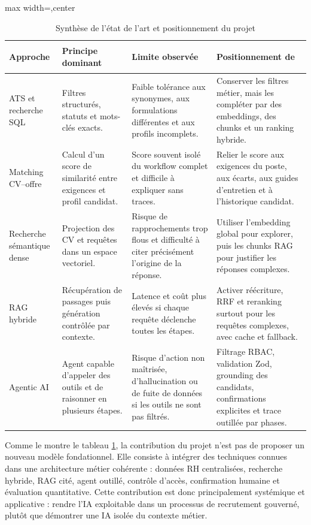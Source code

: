 \begin{table}[H]
  \centering
  \scriptsize
  \caption{\label{tab:state-of-art-positioning}Synthèse de l'état de l'art et positionnement du projet}
  \begin{adjustbox}{max width=\linewidth,center}
  \begin{tabularx}{\textwidth}{>{\bfseries\raggedright\arraybackslash}p{2.8cm}>{\raggedright\arraybackslash}X>{\raggedright\arraybackslash}X>{\raggedright\arraybackslash}X}
    \toprule
    Approche & Principe dominant & Limite observée & Positionnement de \projectname{} \\
    \midrule
    ATS et recherche SQL & Filtres structurés, statuts et mots-clés exacts. & Faible tolérance aux synonymes, aux formulations différentes et aux profils incomplets. & Conserver les filtres métier, mais les compléter par des embeddings, des chunks et un ranking hybride. \\
    Matching CV--offre & Calcul d'un score de similarité entre exigences et profil candidat. & Score souvent isolé du workflow complet et difficile à expliquer sans traces. & Relier le score aux exigences du poste, aux écarts, aux guides d'entretien et à l'historique candidat. \\
    Recherche sémantique dense & Projection des CV et requêtes dans un espace vectoriel. & Risque de rapprochements trop flous et difficulté à citer précisément l'origine de la réponse. & Utiliser l'embedding global pour explorer, puis les chunks RAG pour justifier les réponses complexes. \\
    RAG hybride & Récupération de passages puis génération contrôlée par contexte. & Latence et coût plus élevés si chaque requête déclenche toutes les étapes. & Activer réécriture, RRF et reranking surtout pour les requêtes complexes, avec cache et fallback. \\
    Agentic AI & Agent capable d'appeler des outils et de raisonner en plusieurs étapes. & Risque d'action non maîtrisée, d'hallucination ou de fuite de données si les outils ne sont pas filtrés. & Filtrage RBAC, validation Zod, grounding des candidats, confirmations explicites et trace outillée par phases. \\
    \bottomrule
  \end{tabularx}
  \end{adjustbox}
\end{table}

Comme le montre le tableau \ref{tab:state-of-art-positioning}, la contribution du projet n'est pas de proposer un nouveau modèle fondationnel. Elle consiste à intégrer des techniques connues dans une architecture métier cohérente : données RH centralisées, recherche hybride, RAG cité, agent outillé, contrôle d'accès, confirmation humaine et évaluation quantitative. Cette contribution est donc principalement systémique et applicative : rendre l'IA exploitable dans un processus de recrutement gouverné, plutôt que démontrer une IA isolée du contexte métier.

